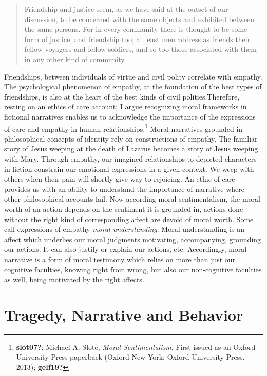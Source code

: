 \documentclass[
  12pt,
]{book}
\theoremstyle{definition}
\theoremstyle{definition}
\theoremstyle{definition}
\theoremstyle{definition}
\theoremstyle{remark}
\begin{document}
\begin{quote}
Friendship and justice seem, as we have said at the outset of our discussion, to be concerned with the same objects and exhibited between the same persons. For in every community there is thought to be some form of justice, and friendship too; at least men address as friends their fellow-voyagers and fellow-soldiers, and so too those associated with them in any other kind of community.
\end{quote}

Friendships, between individuals of virtue and civil polity correlate with empathy. The psychological phenomenon of empathy, at the foundation of the best types of friendships, is also at the heart of the best kinds of civil polities.Therefore, resting on an ethics of care account; I argue recognizing moral frameworks in fictional narratives enables us to acknowledge the importance of the expressions of care and empathy in human relationships.\footnote{\textbf{slot07?}; Michael A. Slote, \emph{Moral {Sentimentalism}}, First issued as an Oxford University Press paperback (Oxford New York: Oxford University Press, 2013); \textbf{gelf19?}} Moral narratives grounded in philosophical concepts of identity rely on constructions of empathy. The familiar story of Jesus weeping at the death of Lazarus becomes a story of Jesus weeping with Mary. Through empathy, our imagined relationships to depicted characters in fiction constrain our emotional expressions in a given context. We weep with others when their pain will shortly give way to rejoicing. An ethic of care provides us with an ability to understand the importance of narrative where other philosophical accounts fail. Now according moral sentimentalism, the moral worth of an action depends on the sentiment it is grounded in, actions done without the right kind of corresponding affect are devoid of moral worth. Some call expressions of empathy \emph{moral understanding}. Moral understanding is an affect which underlies our moral judgments motivating, accompanying, grounding our actions. It can also justify or explain our actions, etc. Accordingly, moral narrative is a form of moral testimony which relies on more than just our cognitive faculties, knowing right from wrong, but also our non-cognitive faculties as well, being motivated by the right affects.

\section{Tragedy, Narrative and Behavior}\label{tragedy-narrative-and-behavior}
\end{document}

